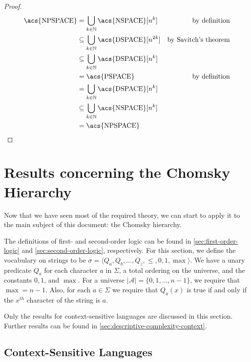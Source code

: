 \begin{proof}
    \begin{align*}
        \text{\acs{NPSPACE}} &= \bigcup_{k \in \mathbb{N}}\text{\acs{NSPACE}}[n^k] & \text{by definition} \\
        &\subseteq \bigcup_{k\in \mathbb{N}}\text{\acs{DSPACE}}[n^{2k}] & \text{by Savitch's theorem} \\
        &\subseteq \bigcup_{k\in \mathbb{N}}\text{\acs{DSPACE}}[n^{k}] \\
        &= \text{\acs{PSPACE}} & \text{by definition} \\
        &= \bigcup_{k\in \mathbb{N}}\text{\acs{DSPACE}}[n^{k}] \\
        &\subseteq \bigcup_{k\in \mathbb{N}}\text{\acs{NSPACE}}[n^{k}] \\
        &= \text{\acs{NPSPACE}}
    \end{align*}
\end{proof}


\section{Results concerning the Chomsky Hierarchy}\label{sec:results-concerning-the-chomsky-hierarchy}

Now that we have seen most of the required theory, we can start to apply it to the main subject of this document: the Chomsky hierarchy.

The definitions of first- and second-order logic can be found in \cref{sec:first-order-logic} and \cref{sec:second-order-logic}, respectively.
For this section, we define the vocabulary on strings to be $\sigma = \langle Q_a, Q_b, \dots, Q_z, \leq , 0, 1, \max \rangle$.
We have a unary predicate $Q_a$ for each character $a$ in $\Sigma$, a total ordering on the universe, and the constants $0, 1$, and $\max$.
For a universe $| \mathcal{A} | = \{0, 1, \dots, n - 1\}$, we require that $\max = n - 1$.
Also, for each $a \in \Sigma$ we require that $Q_a(x)$ is true if and only if the $x^{th}$ character of the string is $a$.

Only the results for context-sensitive languages are discussed in this section.
Further results can be found in \cref{sec:descriptive-complexity-context}.

\subsection{Context-Sensitive Languages}\label{subsec:des-context-sensitive-languages}

